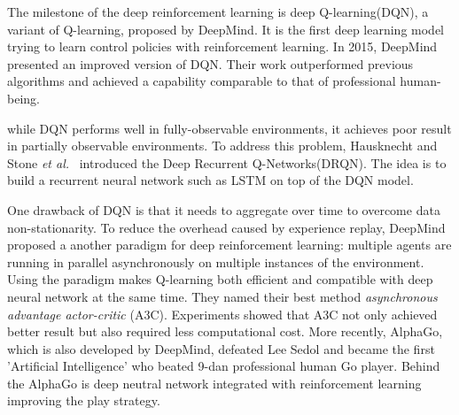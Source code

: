
The milestone of the deep reinforcement learning is deep Q-learning(DQN)\cite{mnih2013playing}, a variant of Q-learning, proposed by DeepMind. It is the first deep learning model trying to learn control policies with reinforcement learning. In 2015, DeepMind presented an improved version of DQN\cite{mnih2015human}. Their work outperformed previous algorithms and achieved a capability comparable to that of professional human-being.
%

while DQN performs well in fully-observable environments, it achieves poor result in partially observable environments. To address this problem, Hausknecht and Stone \textit{et al.}~\cite{hausknecht2015deep} introduced the Deep Recurrent Q-Networks(DRQN). The idea is to build a recurrent neural network such as LSTM on top of the DQN model.
%

One drawback of DQN is that it needs to aggregate over time to overcome data non-stationarity. To reduce the overhead caused by experience replay, DeepMind \cite{mnih2016asynchronous} proposed a another paradigm for deep reinforcement learning: multiple agents are running in parallel asynchronously on multiple instances of the environment. Using the paradigm makes Q-learning both efficient and compatible with deep neural network at the same time. They named their best method \textit{asynchronous advantage actor-critic} (A3C). Experiments showed that A3C not only achieved better result but also required less computational cost.
%
More recently, AlphaGo\cite{brockman2016openai}, which is also developed by DeepMind, defeated Lee Sedol and became the first 'Artificial Intelligence' who beated 9-dan professional human Go player. Behind the AlphaGo is deep neutral network integrated with reinforcement learning improving the play strategy.
%
